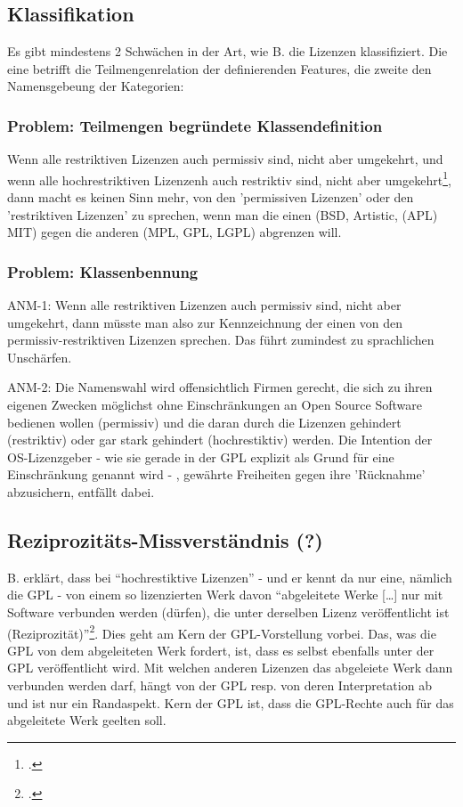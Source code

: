 \documentclass[DIV=calc,BCOR=5mm,11pt,headings=small,oneside,abstract=true, toc=bib]{scrartcl}
\begin{document}
\subsection{Klassifikation}

Es gibt mindestens 2 Schwächen in der Art, wie B. die Lizenzen klassifiziert.
Die eine betrifft die Teilmengenrelation der definierenden Features, die zweite
den Namensgebeung der Kategorien:

\subsubsection{Problem: Teilmengen begründete Klassendefinition}

Wenn alle restriktiven Lizenzen auch permissiv
sind, nicht aber umgekehrt, und wenn alle hochrestriktiven Lizenzenh auch
restriktiv sind, nicht aber umgekehrt\footcite[cf.][62]{Buchtala2007a},
dann macht es keinen Sinn mehr, von den 'permissiven Lizenzen' oder den
'restriktiven Lizenzen' zu sprechen, wenn man die einen (BSD, Artistic, (APL)
MIT) gegen die anderen (MPL, GPL, LGPL) abgrenzen will.

\subsubsection{Problem: Klassenbennung}

ANM-1: Wenn alle restriktiven Lizenzen auch permissiv sind, nicht aber
umgekehrt, dann müsste man also zur Kennzeichnung der einen von den
permissiv-restriktiven Lizenzen sprechen. Das führt zumindest zu sprachlichen
Unschärfen.

ANM-2: Die Namenswahl wird offensichtlich Firmen gerecht, die sich zu ihren
eigenen Zwecken möglichst ohne Einschränkungen an Open Source Software bedienen
wollen (permissiv) und die daran durch die Lizenzen gehindert (restriktiv) oder
gar stark gehindert (hochrestiktiv) werden.  Die Intention der OS-Lizenzgeber -
wie sie gerade in der GPL explizit als Grund für eine Einschränkung genannt wird
- , gewährte Freiheiten gegen ihre 'Rücknahme' abzusichern, entfällt dabei.

\subsection{Reziprozitäts-Missverständnis (?)}

B. erklärt, dass bei \enquote{hochrestiktive Lizenzen} - und er kennt da nur
eine, nämlich die GPL - von einem so lizenzierten Werk davon \enquote{abgeleitete
Werke [\ldots] nur mit Software verbunden werden (dürfen), die unter derselben
Lizenz veröffentlicht ist
(Reziprozität)}\footcite[cf.][62]{Buchtala2007a}. Dies geht am Kern der
GPL-Vorstellung vorbei. Das, was die GPL von dem abgeleiteten Werk fordert, ist,
dass es selbst ebenfalls unter der GPL veröffentlicht wird. Mit welchen anderen
Lizenzen das abgeleiete Werk dann verbunden werden darf, hängt von der GPL resp.
von deren Interpretation ab und ist nur ein Randaspekt. Kern der GPL ist, dass
die GPL-Rechte auch für das abgeleitete Werk geelten soll.

\small

\end{document}
